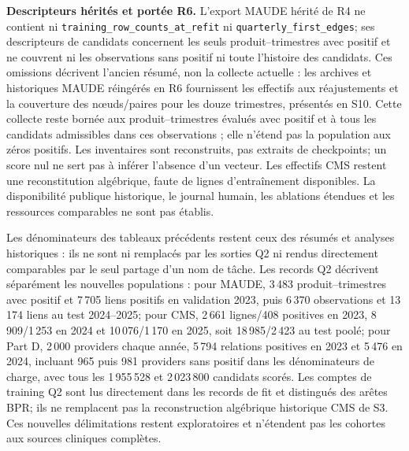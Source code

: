 \documentclass[10pt,a4paper]{article}
\newcommand{\src}[1]{{\small\nolinkurl{#1}}}
\begin{document}
\textbf{Descripteurs hérités et portée R6.} L'export MAUDE hérité de R4 ne contient ni \src{training_row_counts_at_refit} ni \src{quarterly_first_edges}; ses descripteurs de candidats concernent les seuls produit--trimestres avec positif et ne couvrent ni les observations sans positif ni toute l'histoire des candidats. Ces omissions décrivent l'ancien résumé, non la collecte actuelle : les archives et historiques MAUDE réingérés en R6 fournissent les effectifs aux réajustements et la couverture des nœuds/paires pour les douze trimestres, présentés en S10. Cette collecte reste bornée aux produit--trimestres évalués avec positif et à tous les candidats admissibles dans ces observations ; elle n'étend pas la population aux zéros positifs. Les inventaires sont reconstruits, pas extraits de checkpoints; un score nul ne sert pas à inférer l'absence d'un vecteur. Les effectifs CMS restent une reconstitution algébrique, faute de lignes d'entraînement disponibles. La disponibilité publique historique, le journal humain, les ablations étendues et les ressources comparables ne sont pas établis.

Les dénominateurs des tableaux précédents restent ceux des résumés et analyses historiques : ils ne sont ni remplacés par les sorties Q2 ni rendus directement comparables par le seul partage d'un nom de tâche. Les records Q2 décrivent séparément les nouvelles populations : pour MAUDE, 3\,483 produit--trimestres avec positif et 7\,705 liens positifs en validation 2023, puis 6\,370 observations et 13\,174 liens au test 2024--2025; pour CMS, 2\,661 lignes/408 positives en 2023, 8\,909/1\,253 en 2024 et 10\,076/1\,170 en 2025, soit 18\,985/2\,423 au test poolé; pour Part D, 2\,000 providers chaque année, 5\,794 relations positives en 2023 et 5\,476 en 2024, incluant 965 puis 981 providers sans positif dans les dénominateurs de charge, avec tous les 1\,955\,528 et 2\,023\,800 candidats scorés. Les comptes de training Q2 sont lus directement dans les records de fit et distingués des arêtes BPR; ils ne remplacent pas la reconstruction algébrique historique CMS de S3. Ces nouvelles délimitations restent exploratoires et n'étendent pas les cohortes aux sources cliniques complètes.
\end{document}
